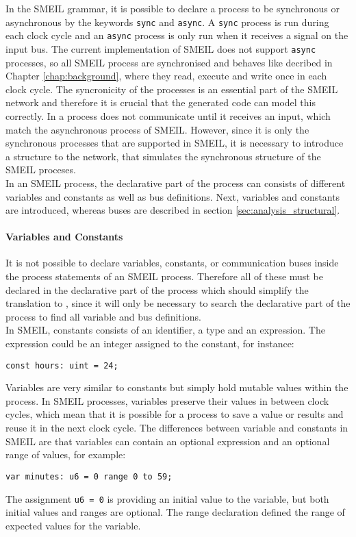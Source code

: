 In the SMEIL grammar, it is possible to declare a process to be synchronous or asynchronous by the keywords \texttt{sync} and \texttt{async}. A \texttt{sync} process is run during each clock cycle and an \texttt{async} process is only run when it receives a signal on the input bus. The current implementation of SMEIL does not support \texttt{async} processes, so all SMEIL process are synchronised and behaves like decribed in Chapter \ref{chap:background}, where they read, execute and write once in each clock cycle. The syncronicity of the processes is an essential part of the SMEIL network and therefore it is crucial that the generated code can model this correctly. In \cspm{} a process does not communicate until it receives an input, which match the asynchronous process of SMEIL. However, since it is only the  synchronous processes that are supported in SMEIL, it is necessary to introduce a structure to the \cspm{} network, that simulates the synchronous structure of the SMEIL proceses.\\

In an SMEIL process, the declarative part of the process can consists of different variables and constants as well as bus definitions. Next, variables and constants are introduced, whereas buses are described in section \ref{sec:analysis_structural}.
\paragraph{Variables and Constants}
It is not possible to declare variables, constants, or communication buses inside the process statements of an SMEIL process. Therefore all of these must be declared in the declarative part of the process which should simplify the translation to \cspm, since it will only be necessary to search the declarative part of the process to find all variable and bus definitions.\\

In SMEIL, constants consists of an identifier, a type and an expression. The expression could be an integer assigned to the constant, for instance:
\begin{verbatim}
const hours: uint = 24;
\end{verbatim}
Variables are very similar to constants but simply hold mutable values within the process. In SMEIL processes, variables preserve their values in between clock cycles, which mean that it is possible for a process to save a value or results and reuse it in the next clock cycle. The differences between variable and constants in SMEIL are that variables can contain an optional expression and an optional range of values, for example:
\begin{verbatim}
var minutes: u6 = 0 range 0 to 59;
\end{verbatim}
The assignment \texttt{u6 = 0} is providing an initial value to the variable, but both initial values and ranges are optional. The range declaration defined the range of expected values for the variable. \\

